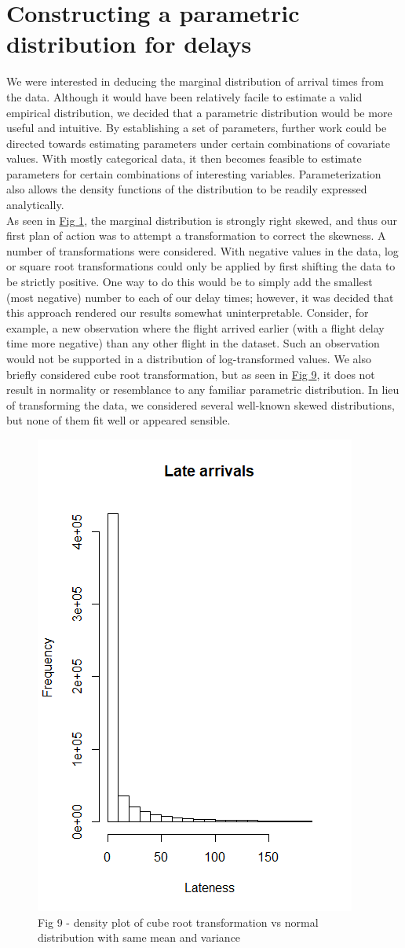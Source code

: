 \documentclass[12pt, a4paper]{book}
\newcommand\tab[1][1cm]{\hspace*{#1}}
\begin{document}
	\section{Constructing a parametric distribution for delays}
	 \tab We were interested in deducing the marginal distribution of arrival times from the data. Although it would have been relatively facile to estimate a valid empirical distribution, we decided that a parametric distribution would be more useful and intuitive. By establishing a set of parameters, further work could be directed towards estimating parameters under certain combinations of covariate values. With mostly categorical data, it then becomes feasible to estimate parameters for certain combinations of interesting variables. Parameterization also allows the density functions of the distribution to be readily expressed analytically.\\
	\tab As seen in \underline{Fig 1}, the marginal distribution is strongly right skewed, and thus our first plan of action was to attempt a transformation to correct the skewness. A number of transformations were considered. With negative values in the data, log or square root transformations could only be applied by first shifting the data to be strictly positive. One way to do this would be to simply add the smallest (most negative) number to each of our delay times; however, it was decided that this approach rendered our results somewhat uninterpretable. Consider, for example, a new observation where the flight arrived earlier (with a flight delay time more negative) than any other flight in the dataset. Such an observation would not be supported in a distribution of log-transformed values. We also briefly considered cube root transformation, but as seen in \underline{Fig 9}, it does not result in normality or resemblance to any familiar parametric distribution. In lieu of transforming the data, we considered several well-known skewed distributions, but none of them fit well or appeared sensible.\\
			\begin{figure}
			\centering
	 		\includegraphics[width = .35 \textwidth]{../figures/LateArrivalsHistogram}
	 		\caption{Fig 9 - density plot of cube root transformation vs normal distribution with same mean and variance}
	 		\end{figure}
\end{document}
